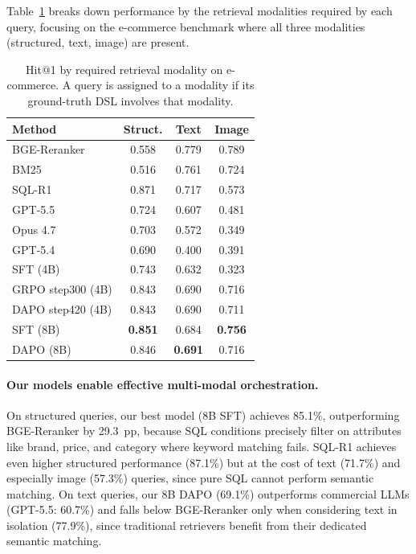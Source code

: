 \documentclass[11pt]{article}
\begin{document}
Table~\ref{tab:modality} breaks down performance by the retrieval modalities required by each query, focusing on the e-commerce benchmark where all three modalities (structured, text, image) are present.

\begin{table}[t]
\centering
\small
\caption{Hit@1 by required retrieval modality on e-commerce. A query is assigned to a modality if its ground-truth DSL involves that modality.}
\label{tab:modality}
\begin{tabular}{lccc}
\toprule
\textbf{Method} & \textbf{Struct.} & \textbf{Text} & \textbf{Image} \\
\midrule
BGE-Reranker & 0.558 & 0.779 & 0.789 \\
BM25 & 0.516 & 0.761 & 0.724 \\
\midrule
SQL-R1 & 0.871 & 0.717 & 0.573 \\
\midrule
GPT-5.5 & 0.724 & 0.607 & 0.481 \\
Opus 4.7 & 0.703 & 0.572 & 0.349 \\
GPT-5.4 & 0.690 & 0.400 & 0.391 \\
\midrule
SFT (4B) & 0.743 & 0.632 & 0.323 \\
GRPO step300 (4B) & 0.843 & 0.690 & 0.716 \\
DAPO step420 (4B) & 0.843 & 0.690 & 0.711 \\
SFT (8B) & \textbf{0.851} & 0.684 & \textbf{0.756} \\
DAPO (8B) & 0.846 & \textbf{0.691} & 0.716 \\
\bottomrule
\end{tabular}
\end{table}

\paragraph{Our models enable effective multi-modal orchestration.}
On structured queries, our best model (8B SFT) achieves 85.1\%, outperforming BGE-Reranker by 29.3~pp, because SQL conditions precisely filter on attributes like brand, price, and category where keyword matching fails. SQL-R1 achieves even higher structured performance (87.1\%) but at the cost of text (71.7\%) and especially image (57.3\%) queries, since pure SQL cannot perform semantic matching.
On text queries, our 8B DAPO (69.1\%) outperforms commercial LLMs (GPT-5.5: 60.7\%) and falls below BGE-Reranker only when considering text in isolation (77.9\%), since traditional retrievers benefit from their dedicated semantic matching.
\end{document}
